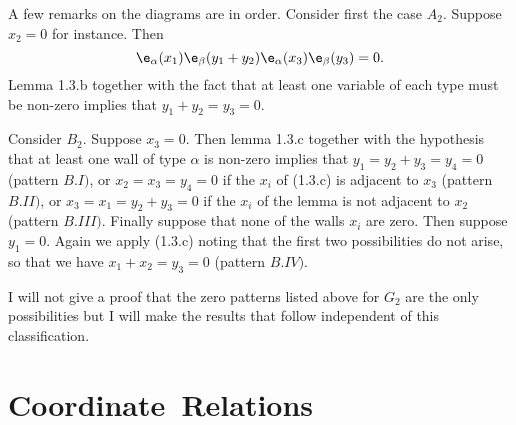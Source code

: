 \documentclass{memo-l}
\theoremstyle{definition}
\theoremstyle{remark}
\numberwithin{section}{chapter}
\numberwithin{equation}{chapter}
\begin{document}
\begin{figure}[htb]
\end{figure}


A few remarks on the diagrams are in order.  Consider first the case $A_{2}$.
Suppose $x_{2}=0$ for instance.   Then
$$
\e_\alpha(x_{1}){\e}_{\beta}(y_{1}+y_{2})
{\e}_{\alpha}(x_{3}){\e}_{\beta}(y_{3}) = 0.
$$
Lemma 1.3.b together with the fact that at least one variable of each
type must be non-zero implies that $y_{1}+y_{2}=y_{3}=0$.

Consider $B_{2}$.  Suppose $x_{3} = 0$.
 Then lemma 1.3.c together with the hypothesis that at least one wall of
type ${\alpha}$ is non-zero implies that $y_{1} = y_{2}+y_{3} = y_{4} = 0$
(pattern $B.I)$, or $x_{2} = x_{3} = y_{4} = 0$ if the $x_{i}$ of (1.3.c) is
adjacent to $x_{3}$ (pattern $B.II)$, or $x_{3} = x_{1} = y_{2}+y_{3} = 0$
if the $x_{i}$ of the lemma is not adjacent to $x_{2}$ (pattern $B.III)$.
 Finally suppose that none of the walls $x_{i}$ are zero.
 Then suppose $y_{1} = 0$.
 Again we apply (1.3.c) noting that the first two possibilities do not
arise, so that we have $x_{1}+x_{2} = y_{3} = 0$ (pattern $B.IV)$.

   I will not give a proof that the zero patterns listed above for $G_{2}$
are the only possibilities but I will make the results that follow independent
of this classification.

\section{Coordinate\ Relations}
\end{document}
